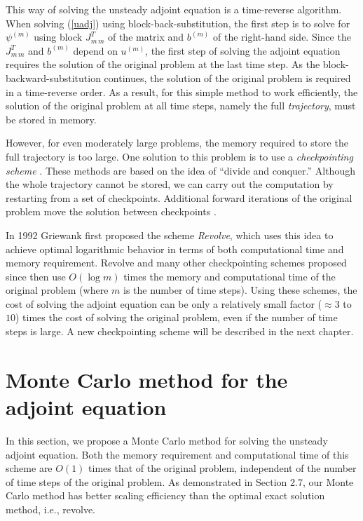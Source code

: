    This way of solving the unsteady adjoint equation is a time-reverse
    algorithm.  When solving (\ref{uadj}) using block-back-substitution,
    the first step is to solve for $\psi^{(m)}$ using block $J_{m\,m}^T$
    of the matrix and $b^{(m)}$ of the right-hand side.  Since the
    $J_{m\,m}^T$ and $b^{(m)}$ depend on $u^{(m)}$, the first step of
    solving the adjoint equation requires the solution of the original
    problem at the last time step.  As the block-backward-substitution
    continues, the solution of the original problem is required in a
    time-reverse order.  As a result, for this simple method to work
    efficiently, the solution of the original problem at all time steps,
    namely the full \emph{trajectory}, must be stored in memory.
    
    However, for even moderately large problems, the memory required to
    store the full trajectory is too large.  One solution to this problem
    is to use a \emph{checkpointing scheme} \cite[]{griewank92}
    \cite[]{Griewank2003} \cite[]{Griewank2004}.  These methods are based on the
    idea of ``divide and conquer.''  Although the whole trajectory cannot be
    stored,
    we can carry out the computation by restarting from a set of checkpoints.
    Additional forward iterations of the original problem move the solution
    between checkpoints \cite[]{charpentier2001}.
    
    In 1992 Griewank \cite[]{griewank92} first proposed the scheme
    \emph{Revolve}, which uses this idea to achieve optimal logarithmic
    behavior in terms of both computational time and memory requirement.
    Revolve and many other checkpointing schemes proposed since then use
    $O(\log m)$ times the memory and computational time of the original problem
    (where $m$ is the number of time steps).
    Using these schemes, the cost of solving the adjoint equation
    can be only a relatively small factor ($\approx 3$ to $10$)
    times the cost of solving the original
    problem, even if the number of time steps is large.
    A new checkpointing scheme will be described in the next chapter.





\section{Monte Carlo method for the adjoint equation}
    In this section, we propose a Monte Carlo method for solving the unsteady
    adjoint equation.  Both the memory requirement and computational time of
    this scheme are $O(1)$ times that of the original problem, independent
    of the number of time steps of the original problem.  As demonstrated
    in Section 2.7, our Monte Carlo method has better scaling efficiency than
    the optimal exact solution method, i.e., revolve.
    
